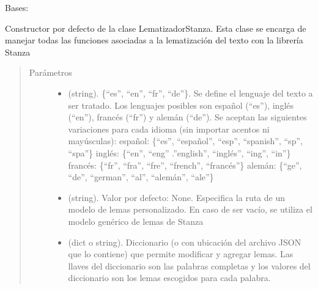 \documentclass[letterpaper,10pt,openany,spanish]{sphinxmanual}
\begin{document}
\begin{fulllineitems}
\label{\detokenize{funciones/lematizacion:lematizacion.LematizadorStanza}}
Bases: 

Constructor por defecto de la clase LematizadorStanza. Esta clase se         encarga de manejar todas las funciones asociadas a la lematización         del texto con la librería Stanza
\begin{quote}\begin{description}
\item[{Parámetros}] \leavevmode\begin{itemize}
\item {} 
 \textendash{} (string). \{“es”, “en”, “fr”, “de”\}. Se define el             lenguaje del texto a ser tratado. Los lenguajes posibles son español             (“es”), inglés (“en”), francés (“fr”) y alemán (“de”). Se aceptan las             siguientes variaciones para cada idioma (sin importar acentos ni mayúsculas):                    español: \{“es”, “español”, “esp”, “spanish”, “sp”, “spa”\} 
 inglés: \{“en”, “eng” .”english”, “inglés”, “ing”, “in”\} 
 francés: \{“fr”, “fra”, “fre”, “french”, “francés”\} 
 alemán: \{“ge”, “de”, “german”, “al”, “alemán”, “ale”\}   

\item {} 
 \textendash{} (string). Valor por defecto: None. Especifica la ruta             de un modelo de lemas personalizado. En caso de ser vacío, se utiliza             el modelo genérico de lemas de Stanza

\item {} 
 \textendash{} (dict o string). Diccionario (o  con ubicación del             archivo JSON que lo contiene) que permite modificar y agregar lemas. Las             llaves del diccionario son las palabras completas y los valores del             diccionario son los lemas escogidos para cada palabra.


\end{itemize}
\end{description}
\end{quote}
\end{fulllineitems}
\end{document}
